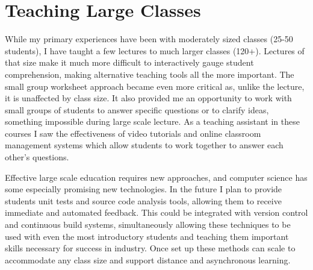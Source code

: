 \documentclass[a4paper, 11pt]{article}
\begin{document}
\section{Teaching Large Classes}
While my primary experiences have been with moderately sized
classes (25-50 students), I have taught a few lectures to much
larger classes (120+). Lectures of that size make it much more
difficult to interactively gauge student comprehension, making
alternative teaching tools all the more important. The small
group worksheet approach became even more critical as, unlike
the lecture, it is unaffected by class size. It also provided
me an opportunity to work with small groups of students to
answer specific questions or to clarify ideas, something impossible
during large scale lecture. As a teaching assistant in these
courses I saw the effectiveness of video tutorials and online
classroom management systems which allow students to work together to answer each other's questions.

Effective large scale education requires new approaches,
and computer science has some especially promising new
technologies. In the future I plan to provide students
unit tests and source code analysis tools, allowing them
to receive immediate and automated feedback. This could
be integrated with version control and continuous build systems,
simultaneously allowing these techniques to be used with even
the most introductory students and teaching them important
skills necessary for success in industry. Once set up these
methods can scale to accommodate any class size and support
distance and asynchronous learning.

\begin{comment}
\section{Outreach}
During my masters I was the chair of an ACM SIG set up to organize
the MegaMinerAI programming competition each semester.
In this competition small teams of students are given
24 hours to write programs which act as the player in a computer game.
These programs compete with those written by other students,
with the results visualized. The competition focuses on making
it as easy as possible to write useful AIs, and making the game
as visually interpretable as possible. These goals help create
a community building challenge which is open to creativity and
translates student's work into visual improvement.
The competition saw a significant growth in participation under
my direction, with nearly 100 competitors from a department of
only 400 students. For my work with the organization the department
awarded me “Leader of the Year.”
\end{comment}
\end{document}
